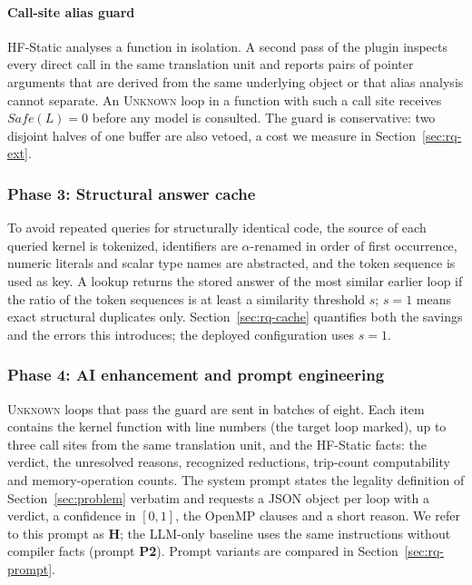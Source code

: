 \paragraph{Call-site alias guard} HF-Static analyses a function in isolation. A second pass of the plugin inspects every direct call in the same translation unit and reports pairs of pointer arguments that are derived from the same underlying object or that alias analysis cannot separate. An \textsc{Unknown} loop in a function with such a call site receives $\mathit{Safe}(L)=0$ before any model is consulted. The guard is conservative: two disjoint halves of one buffer are also vetoed, a cost we measure in Section~\ref{sec:rq-ext}.

\subsubsection{Phase 3: Structural answer cache}
\label{sec:cachedesign}
To avoid repeated queries for structurally identical code, the source of each queried kernel is tokenized, identifiers are $\alpha$-renamed in order of first occurrence, numeric literals and scalar type names are abstracted, and the token sequence is used as key. A lookup returns the stored answer of the most similar earlier loop if the  ratio of the token sequences is at least a similarity threshold $s$; $s=1$ means exact structural duplicates only. Section~\ref{sec:rq-cache} quantifies both the savings and the errors this introduces; the deployed configuration uses $s=1$.

\subsubsection{Phase 4: AI enhancement and prompt engineering}
\label{sec:hybrid}
\textsc{Unknown} loops that pass the guard are sent in batches of eight. Each item contains the kernel function with line numbers (the target loop marked), up to three call sites from the same translation unit, and the HF-Static facts: the verdict, the unresolved reasons, recognized reductions, trip-count computability and memory-operation counts. The system prompt states the legality definition of Section~\ref{sec:problem} verbatim and requests a JSON object per loop with a verdict, a confidence in $[0,1]$, the OpenMP clauses and a short reason. We refer to this prompt as \textbf{H}; the LLM-only baseline uses the same instructions without compiler facts (prompt \textbf{P2}). Prompt variants are compared in Section~\ref{sec:rq-prompt}.

